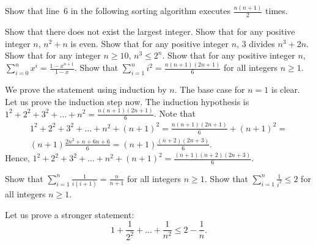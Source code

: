 \begin{exercise}
\label{exercise:selection-sort}
    Show that line~6 in the following sorting algorithm executes
    $\frac{n (n + 1)}{2}$ times.

\end{exercise}
\begin{chapterendexercises}
    \exercise Show that there does not exist the largest integer.
    \exercise[recommended] Show that for any positive integer $n$, $n^2 + n$ is even.
    \exercise Show that for any positive integer $n$, $3$ divides
        $n^3 + 2n$.
    \exercise Show that for any integer $n \ge 10$,
        $n^3 \le 2^n$.
    \exercise Show that for any positive integer $n$,
        $\sum_{i = 0}^n x^i = \frac{1 - x^{n + 1}}{1 - x}$.
    \exercise[recommended] Show that $\sum_{i = 1}^n i^2 =
        \frac{n (n + 1)(2n + 1)}{6}$ for all integers $n \ge 1$.
        \begin{solution}
          We prove the statement using induction by $n$. The base case for $n =
          1$ is clear. Let us prove the induction step now. The induction
          hypothesis is 
          $1^2 + 2^2 + 3^2 + \dots + n^2 = \frac{n (n + 1)(2n + 1)}{6}$. 
          Note that
          \begin{multline*}
            1^2 + 2^2 + 3^2 + \dots + n^2 + (n + 1)^2 = \frac{n (n + 1)(2n + 1)}{6} +
            (n + 1)^2 = \\
            (n + 1)\frac{2n^2 + n + 6n + 6}{6} = (n + 1)\frac{(n + 2)(2n + 3)}{6}.
          \end{multline*}
          Hence, $1^2 + 2^2 + 3^2 + \dots + n^2 + (n + 1)^2 = 
            \frac{(n + 1)(n + 2)(2n + 3)}{6}$.
        \end{solution}
    \exercise Show that $\sum_{i = 1}^n \frac{1}{i (i + 1)} = 
      \frac{n}{n + 1}$ for all integers $n \ge 1$.
    \exercise Show that $\sum_{i = 1}^n \frac{1}{i^2} \le 2$ for all integers 
      $n \ge 1$.
      \begin{solution}
        Let us prove a stronger statement:
        \[
          1 + \frac{1}{2^2} + \dots + \frac{1}{n^2} \le 2 - \frac{1}{n}.
        \]


\end{solution}
\end{chapterendexercises}

